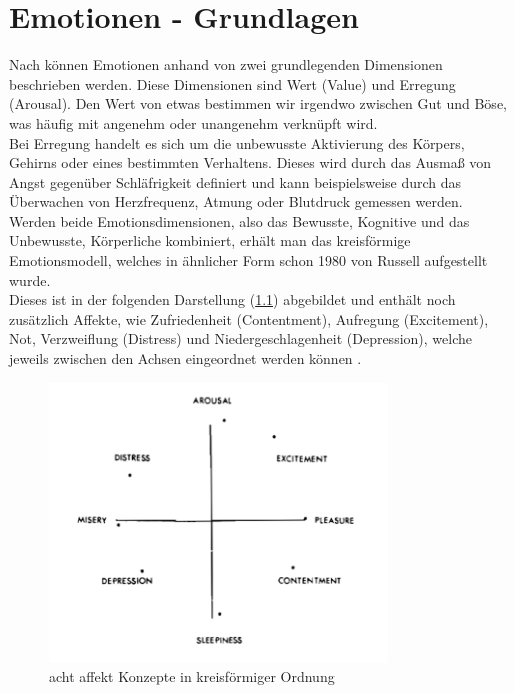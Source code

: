\documentclass[./dokumentation.tex]{subfiles}
\begin{document}
\chapter{Emotionen - Grundlagen}
Nach  \cite{vanGorp2013} können Emotionen anhand von zwei grundlegenden Dimensionen beschrieben werden. Diese Dimensionen sind Wert (Value) und Erregung (Arousal). Den Wert von etwas bestimmen wir irgendwo zwischen Gut und Böse, was häufig mit angenehm oder unangenehm verknüpft wird. \\
Bei Erregung handelt es sich um die unbewusste Aktivierung des Körpers, Gehirns oder eines bestimmten Verhaltens. Dieses wird durch das Ausmaß von Angst gegenüber Schläfrigkeit definiert und kann beispielsweise durch das Überwachen von Herzfrequenz, Atmung oder Blutdruck gemessen werden. Werden beide Emotionsdimensionen, also das Bewusste, Kognitive und das Unbewusste, Körperliche kombiniert, erhält man das kreisförmige Emotionsmodell, welches in ähnlicher Form schon 1980 von Russell aufgestellt wurde.\\ 
Dieses ist in der folgenden Darstellung (\ref{fig4:affect}) abgebildet und enthält noch zusätzlich Affekte, wie Zufriedenheit (Contentment), Aufregung (Excitement), Not, Verzweiflung (Distress) und Niedergeschlagenheit (Depression), welche jeweils zwischen den Achsen eingeordnet werden können  \cite{Russell1980}. \\

\begin{figure}[h]
    \centering
    \includegraphics[width=0.8\textwidth]{bilder/russell1.png}
    \caption{acht affekt Konzepte in kreisförmiger Ordnung \cite{Russell1980}}
    \label{fig4:affect}
\end{figure}\\
\end{document}

